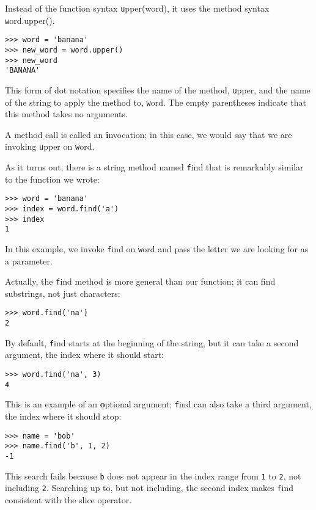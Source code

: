 \documentclass[
DIV=11,
fontsize=12,
twoside,
headinclude=false,
titlepage=firstiscover,
abstract=true,
headsepline=true,
footsepline=true,
chapterprefix=true, %
headings=big,
bibliography=totoc,%
captions=tableheading
]{scrbook}
\theoremstyle{definition}
\begin{document}
Instead of the function syntax {\texttt upper(word)}, it uses
the method syntax {\texttt word.upper()}.

\begin{lstlisting}
>>> word = 'banana'
>>> new_word = word.upper()
>>> new_word
'BANANA'
\end{lstlisting}
%
This form of dot notation specifies the name of the method, {\texttt
upper}, and the name of the string to apply the method to, {\texttt
word}.  The empty parentheses indicate that this method takes no
arguments.

A method call is called an {\textbf invocation}; in this case, we would
say that we are invoking {\texttt upper} on {\texttt word}.

As it turns out, there is a string method named {\texttt find} that
is remarkably similar to the function we wrote:

\begin{lstlisting}
>>> word = 'banana'
>>> index = word.find('a')
>>> index
1
\end{lstlisting}
%
In this example, we invoke {\texttt find} on {\texttt word} and pass
the letter we are looking for as a parameter.

Actually, the {\texttt find} method is more general than our function;
it can find substrings, not just characters:

\begin{lstlisting}
>>> word.find('na')
2
\end{lstlisting}
%
By default, {\texttt find} starts at the beginning of the string, but
it can take a second argument, the index where it should start:

\begin{lstlisting}
>>> word.find('na', 3)
4
\end{lstlisting}
%
This is an example of an {\textbf optional argument};
{\texttt find} can
also take a third argument, the index where it should stop:

\begin{lstlisting}
>>> name = 'bob'
>>> name.find('b', 1, 2)
-1
\end{lstlisting}
%
This search fails because {\texttt b} does not
appear in the index range from {\texttt 1} to {\texttt 2}, not including {\texttt
2}.  Searching up to, but not including, the second index makes
{\texttt find} consistent with the slice operator.
\end{document}
